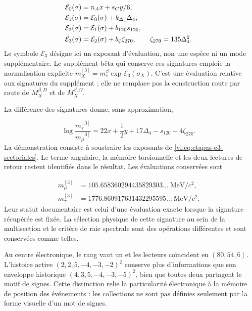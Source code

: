 \begin{align}
 \mathcal E_0(\sigma)&=n_Ax+s_Cy/6,\notag\\
 \mathcal E_1(\sigma)&=\mathcal E_0(\sigma)+k_{\Delta_4}\Delta_4,\notag\\
 \mathcal E_2(\sigma)&=\mathcal E_1(\sigma)+b_{120}s_{120},\notag\\
 \mathcal E_3(\sigma)&=\mathcal E_2(\sigma)+b_\zeta\zeta_{270},
 \qquad\zeta_{270}=135\Delta_4^2.
 \label{vi:eq:etapas-e3-sectoriales}
\end{align}
Le symbole \(\mathcal E_3\) désigne ici un exposant d’évaluation,
non une espèce ni un mode supplémentaire. Le supplément bêta qui conserve ces
signatures emploie la normalisation explicite
\(m_X^{[3]}=m_e^\beta\exp\mathcal E_3(\sigma_X)\).
C’est une évaluation relative aux signatures du supplément ; elle ne remplace pas
la construction route par route de \(M_X^{\beta,D}\) et de
\(M_X^{\beta,\Omega}\).


La différence des signatures donne, sans approximation,

\begin{equation}
 \log\frac{m_\tau^{[3]}}{m_\mu^{[3]}}
 =22x+\frac12y+17\Delta_4-s_{120}+4\zeta_{270}.
 \label{vi:eq:razon-tau-muon}
\end{equation}
La démonstration consiste à soustraire les exposants de
\eqref{vi:eq:etapas-e3-sectoriales}. Le terme angulaire, la mémoire
torsionnelle et les deux lectures de retour restent identifiés dans le
résultat. Les évaluations conservées sont

\begin{align*}
 m_\mu^{[3]}&=105.658360294435829303\ldots\ \mathrm{MeV}/c^2,\\
 m_\tau^{[3]}&=1776.860917631432295595\ldots\ \mathrm{MeV}/c^2.
\end{align*}
Leur statut documentaire est celui d’une évaluation exacte lorsque la signature récupérée est fixée.
La sélection physique de cette signature au sein de la multisection et le critère
de raie spectrale sont des opérations différentes et sont conservées comme telles.


Au centre électronique, le rang vaut un et les lecteurs coïncident en
\((80,54,6)\). L’histoire active
\((2,2,5,-4,-3,-2)^2\) conserve plus d’informations que son enveloppe
historique \((4,3,5,-4,-3,-5)^2\), bien que toutes deux partagent le motif de
signes. Cette distinction relie la particularité électronique à la
mémoire de position des événements : les collections ne sont pas définies seulement par
la forme visuelle d’un mot de signes.


